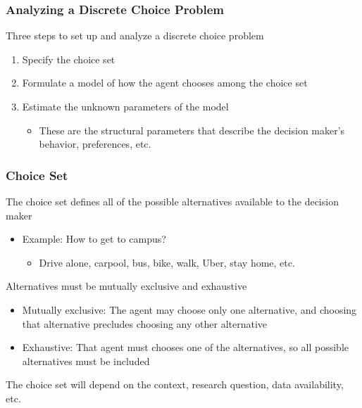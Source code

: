\documentclass{beamer}\usepackage[]{graphicx}\usepackage[]{xcolor}
\begin{document}
\begin{frame}\frametitle{Analyzing a Discrete Choice Problem}
    Three steps to set up and analyze a discrete choice problem
    \begin{enumerate}
    	\item Specify the choice set
    	\item Formulate a model of how the agent chooses among the choice set
    	\item Estimate the unknown parameters of the model
    	\begin{itemize}
    		\item These are the structural parameters that describe the decision maker's behavior, preferences, etc.
    	\end{itemize}
    \end{enumerate}
\end{frame}

\begin{frame}\frametitle{Choice Set}
    The choice set defines all of the possible alternatives available to the decision maker
    \begin{itemize}
    	\item Example: How to get to campus?
    	\begin{itemize}
    		\item Drive alone, carpool, bus, bike, walk, Uber, stay home, etc.
    	\end{itemize}
    \end{itemize}
    \vspace{2ex}
    Alternatives must be mutually exclusive and exhaustive
    \begin{itemize}
    	\item Mutually exclusive: The agent may choose only one alternative, and choosing that alternative precludes choosing any other alternative
    	\item Exhaustive: That agent must chooses one of the alternatives, so all possible alternatives must be included
    \end{itemize}
    \vspace{2ex}
    The choice set will depend on the context, research question, data availability, etc.
\end{frame}
\end{document}
